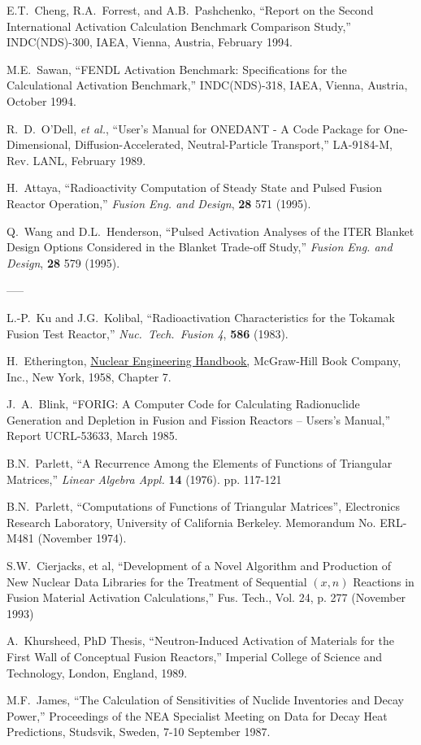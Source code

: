 \begin{thebibliography}{100}
E.T.~Cheng, R.A.~Forrest, and
  A.B.~Pashchenko, ``Report on the Second International Activation
  Calculation Benchmark Comparison Study,'' INDC(NDS)-300, IAEA,
  Vienna, Austria, February 1994.

M.E.~Sawan, ``FENDL Activation
  Benchmark: Specifications for the Calculational Activation
  Benchmark,'' INDC(NDS)-318, IAEA, Vienna, Austria, October 1994.

R.~D.~O'Dell, \textsl{et al.}, ``User's Manual
  for ONEDANT - A Code Package for One-Dimensional,
  Diffusion-Accelerated, Neutral-Particle Transport,'' LA-9184-M, Rev.
  LANL, February 1989.
  
 H.~Attaya, ``Radioactivity Computation of Steady
  State and Pulsed Fusion Reactor Operation,'' \textsl{Fusion Eng. and
  Design}, \textbf{28} 571 (1995).

 Q.~Wang and D.L.~Henderson, ``Pulsed Activation
  Analyses of the ITER Blanket Design Options Considered in the
  Blanket Trade-off Study,'' \textsl{Fusion Eng. and Design},
  \textbf{28} 579 (1995).

  
 -----  
 
 L.-P.~Ku and J.G.~Kolibal, ``Radioactivation
  Characteristics for the Tokamak Fusion Test Reactor,''
  \textsl{Nuc.~Tech.~Fusion 4}, \textbf{586} (1983).
  
 H.~Etherington, \underline{Nuclear Engineering
    Handbook,} McGraw-Hill Book Company, Inc., New York, 1958, Chapter
  7.
  
 J.~A.~Blink, ``FORIG: A Computer Code for
  Calculating Radionuclide Generation and Depletion in Fusion and
  Fission Reactors -- Users's Manual,'' Report UCRL-53633, March 1985.
  
 B.N.~Parlett, ``A Recurrence Among the Elements
  of Functions of Triangular Matrices,'' \textsl{Linear Algebra Appl.}
  \textbf{14} (1976). pp. 117-121
  
 B.N.~Parlett, ``Computations of Functions of
  Triangular Matrices'', Electronics Research Laboratory, University
  of California Berkeley.  Memorandum No. ERL-M481 (November 1974).
  
 S.W.~Cierjacks, et al, ``Development of a
  Novel Algorithm and Production of New Nuclear Data Libraries for the
  Treatment of Sequential $(x,n)$ Reactions in Fusion Material
  Activation Calculations,'' Fus. Tech., Vol. 24, p. 277 (November
  1993)
    
 A.~Khursheed, PhD Thesis, ``Neutron-Induced
  Activation of Materials for the First Wall of Conceptual Fusion
  Reactors,'' Imperial College of Science and Technology, London,
  England, 1989.
    
 M.F.~James, ``The Calculation of Sensitivities
  of Nuclide Inventories and Decay Power,'' Proceedings of the NEA
  Specialist Meeting on Data for Decay Heat Predictions, Studsvik,
  Sweden, 7-10 September 1987.
    
  
\end{thebibliography}

